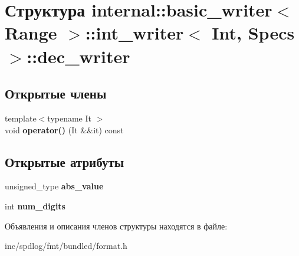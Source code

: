 \hypertarget{structinternal_1_1basic__writer_1_1int__writer_1_1dec__writer}{}\section{Структура internal\+:\+:basic\+\_\+writer$<$ Range $>$\+:\+:int\+\_\+writer$<$ Int, Specs $>$\+:\+:dec\+\_\+writer}
\label{structinternal_1_1basic__writer_1_1int__writer_1_1dec__writer}
\subsection*{Открытые члены}
\begin{DoxyCompactItemize}
\item 
\mbox{\label{structinternal_1_1basic__writer_1_1int__writer_1_1dec__writer_a39fac9002e483e36344aa2ecfa3771be}} 
{\footnotesize template$<$typename It $>$ }\\void {\bfseries operator()} (It \&\&it) const
\end{DoxyCompactItemize}
\subsection*{Открытые атрибуты}
\begin{DoxyCompactItemize}
\item 
\mbox{\label{structinternal_1_1basic__writer_1_1int__writer_1_1dec__writer_a760d65cdbec80ce04a3e9ecdbff3ef45}} 
unsigned\+\_\+type {\bfseries abs\+\_\+value}
\item 
\mbox{\label{structinternal_1_1basic__writer_1_1int__writer_1_1dec__writer_afbb2b54dec20f26493c90b2113734526}} 
int {\bfseries num\+\_\+digits}
\end{DoxyCompactItemize}


Объявления и описания членов структуры находятся в файле\+:\begin{DoxyCompactItemize}
\item 
inc/spdlog/fmt/bundled/format.\+h\end{DoxyCompactItemize}
